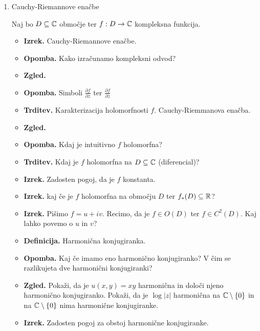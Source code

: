 \begin{enumerate}
    \item Cauchy-Riemannove enačbe
    
    Naj bo \(D \subseteq \mathbb{C}\) območje ter \(f: D \to \mathbb{C}\) kompleksna funkcija.
    \begin{itemize}
        \item \textbf{Izrek.} Cauchy-Riemannove enačbe. 
        \item \textbf{Opomba.} Kako izračunamo kompleksni odvod?
        \item \textbf{Zgled.} 
        \item \textbf{Opomba.} Simboli \(\frac{\partial f}{\partial \overline{z}}\) ter \(\frac{\partial f}{\partial z}\)
        \item \textbf{Trditev.} Karakterizacija holomorfnosti \(f\). Cauchy-Riemmanova enačba.
        \item \textbf{Zgled.} 
        \item \textbf{Opomba.} Kdaj je intuitivno \(f\) holomorfna?
        \item \textbf{Trditev.} Kdaj je \(f\) holomorfna na \(D \subseteq \mathbb{C}\) (diferencial)?
        \item \textbf{Izrek.} Zadosten pogoj, da je \(f\) konstanta.
        \item \textbf{Izrek.} kaj če je \(f\) holomorfna na območju \(D\) ter \(f_{*}(D) \subseteq \mathbb{R}\)?
        \item \textbf{Izrek.} Pišimo \(f = u + iv\). Recimo, da je \(f \in O(D)\) ter \(f \in C^2(D)\). Kaj lahko povemo o \(u\) in \(v\)?
        \item \textbf{Definicija.} Harmonična konjugiranka.
        \item \textbf{Opomba.} Kaj če imamo eno harmonično konjugiranko? V čim se razlikujeta dve harmonični konjugiranki?
        \item \textbf{Zgled.} Pokaži, da je \(u(x, y) = xy\) harmonična in določi njeno harmonično konjugiranko.  Pokaži, da je \(\log |z|\) harmonična na \(\mathbb{C} \setminus \{0\}\) in na \(\mathbb{C} \setminus \{0\}\) nima harmonične konjugiranke.
        \item \textbf{Izrek.} Zadosten pogoj za obstoj harmonične konjugiranke.
    \end{itemize}


\end{enumerate}
